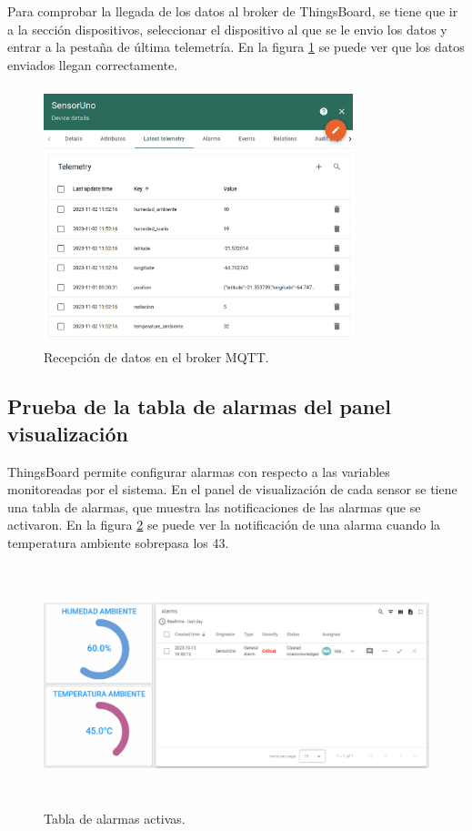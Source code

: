 Para comprobar la llegada de los datos al broker de ThingsBoard, se tiene que ir a la sección dispositivos, seleccionar el dispositivo al que se le envio los datos y entrar a la pestaña de última telemetría. En la figura \ref{fig:tb recepcion} se puede ver que los datos enviados llegan correctamente.

\begin{figure}[h!]
  \centering
    \includegraphics[width=9cm, height=7.5cm]{./Figures/tb_recepcion2.png}
  \caption{Recepción de datos en el broker MQTT.}
    \label{fig:tb recepcion}
\end{figure}

\subsection{Prueba de la tabla de alarmas del panel visualización}
ThingsBoard permite configurar alarmas con respecto a las variables monitoreadas por el sistema. En el panel de visualización de cada sensor se tiene una tabla de alarmas, que muestra las notificaciones de las alarmas que se activaron.
En la figura \ref{fig:alarmas tb} se puede ver la notificación de una alarma cuando la temperatura ambiente sobrepasa los 43\textcelsius.

\begin{figure}[h!]
  \centering
    \includegraphics[width=\linewidth, height=7cm]{./Figures/alarmas_tb.png}
  \caption{Tabla de alarmas activas.}
    \label{fig:alarmas tb}
\end{figure}

